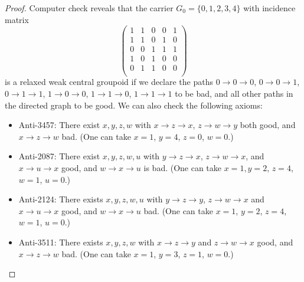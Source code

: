 \begin{proof}
  Computer check reveals that the carrier $G_0=\{0,1,2,3 ,4\}$ with incidence matrix
  $$
  \begin{pmatrix}
   1 & 1 & 0 & 0 & 1 \\
   1 & 1 & 0 & 1 & 0 \\
   0 & 0 & 1 & 1 & 1 \\
   1 & 0 & 1 & 0 & 0 \\
   0 & 1 & 1 & 0 & 0 \\
  \end{pmatrix}
  $$
  is a relaxed weak central groupoid if we declare the paths $0 \to 0 \to 0$, $0 \to 0 \to 1$, $0 \to 1 \to 1$, $1 \to 0 \to 0$, $1 \to 1 \to 0$, $1 \to 1 \to 1$ to be bad, and all other paths in the directed graph to be good. We can also check the following axioms:
  \begin{itemize}
   \item Anti-3457: There exist $x,y,z,w$ with $x \to z \to x$,  $z \to w \to y$ both good, and $x \to z \to w$ bad. (One can take $x=1$, $y=4$, $z = 0$, $w = 0$.)
   \item Anti-2087: There exist $x,y,z,w,u$ with $y \to z \to x$, $z \to w \to x$, and $x \to u \to x$ good, and $w \to x \to u$ is bad. (One can take $x=1, y=2$, $z=4$, $w=1$, $u=0$.)
   \item Anti-2124: There exists $x,y,z,w,u$ with $y \to z \to y$, $z \to w \to x$ and $x \to u \to x$ good, and $w \to x \to u$  bad. (One can take $x=1$, $y=2$, $z=4$, $w = 1$, $u=0$.)
   \item Anti-3511: There exists $x,y,z,w$ with $x \to z \to y$ and $z \to w \to x$ good, and $x \to z \to w$ bad. (One can take $x=1$, $y=3$, $z = 1$, $w=0$.)
  \end{itemize}


\end{proof}
